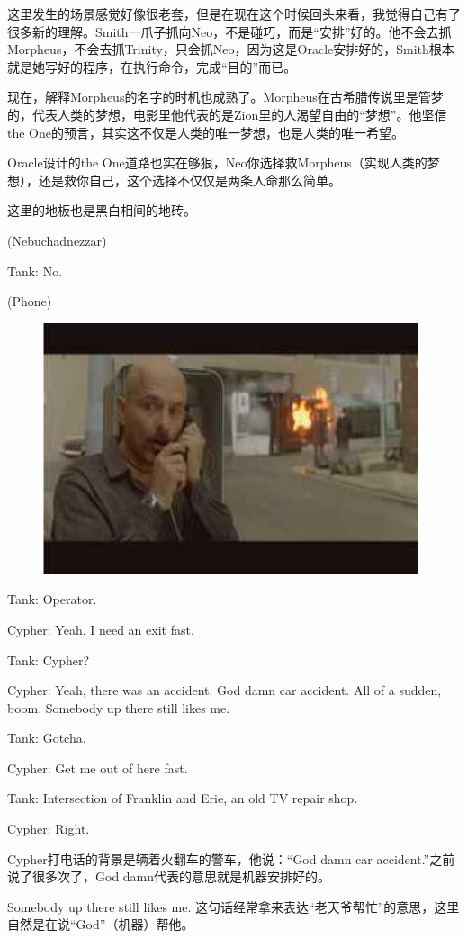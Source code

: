 \documentclass[UTF8]{ctexart}
\newenvironment{myquote}{\color{green} \setlength{\leftskip}{6em} \setlength{\rightskip}{4em} \setlength{\parindent}{-2em}}{\par}
\begin{document}
这里发生的场景感觉好像很老套，但是在现在这个时候回头来看，我觉得自己有了很多新的理解。Smith一爪子抓向Neo，不是碰巧，而是“安排”好的。他不会去抓Morpheus，不会去抓Trinity，只会抓Neo，因为这是Oracle安排好的，Smith根本就是她写好的程序，在执行命令，完成“目的”而已。

现在，解释Morpheus的名字的时机也成熟了。Morpheus在古希腊传说里是管梦的，代表人类的梦想，电影里他代表的是Zion里的人渴望自由的“梦想”。他坚信the One的预言，其实这不仅是人类的唯一梦想，也是人类的唯一希望。

Oracle设计的the One道路也实在够狠，Neo你选择救Morpheus（实现人类的梦想），还是救你自己，这个选择不仅仅是两条人命那么简单。

这里的地板也是黑白相间的地砖。

\begin{myquote}
(Nebuchadnezzar)

Tank: No.

(Phone)

\begin{figure}[htb]
\centering
\includegraphics[width=0.5\linewidth]{fig/read_Matrix-57}
\end{figure}

Tank: Operator.

Cypher: Yeah, I need an exit fast.

Tank: Cypher?

Cypher: Yeah, there was an accident. God damn car accident. All of a sudden, boom. Somebody up there still likes me.

Tank: Gotcha.

Cypher: Get me out of here fast.

Tank: Intersection of Franklin and Erie, an old TV repair shop.

Cypher: Right.
\end{myquote}

Cypher打电话的背景是辆着火翻车的警车，他说：“God damn car accident.”之前说了很多次了，God damn代表的意思就是机器安排好的。

Somebody up there still likes me. 这句话经常拿来表达“老天爷帮忙”的意思，这里自然是在说“God”（机器）帮他。
\end{document}
